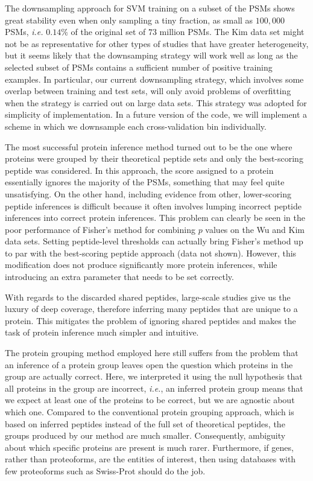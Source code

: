 \documentclass{article}
\begin{document}
The downsampling approach for SVM training on a subset of the PSMs 
shows great stability even when only sampling a tiny fraction, as 
small as $100,000$ PSMs, {\em i.e.} $0.14\%$ of the original set of 
$73$ million PSMs.  The Kim data set might not be as representative 
for other types of studies that have greater heterogeneity, but it 
seems likely that the downsamping strategy will work well as long as 
the selected subset of PSMs contains a sufficient number of positive 
training examples. In particular, our current downsampling strategy, 
which involves some overlap between training and test sets, will only 
avoid problems of overfitting when the strategy is carried out on 
large data sets. This strategy was adopted for simplicity of 
implementation. In a future version of the code, we will implement a 
scheme in which we downsample each cross-validation bin individually.

The most successful protein inference method turned out to be the one
where proteins were grouped by their theoretical peptide sets and only
the best-scoring peptide was considered. In this approach, the score
assigned to a protein essentially ignores the majority of the PSMs,
something that may feel quite unsatisfying. On the other hand,
including evidence from other, lower-scoring peptide inferences is
difficult because it often involves lumping incorrect peptide
inferences into correct protein inferences.  This problem can clearly
be seen in the poor performance of Fisher's method for combining $p$
values on the Wu and Kim data sets. Setting peptide-level thresholds
can actually bring Fisher's method up to par with the best-scoring
peptide approach (data not shown). However, this modification does not
produce significantly more protein inferences, while introducing an
extra parameter that needs to be set correctly.

With regards to the discarded shared peptides, large-scale studies
give us the luxury of deep coverage, therefore inferring many
peptides that are unique to a protein. This mitigates the problem of
ignoring shared peptides and makes the task of protein inference much
simpler and intuitive.  

The protein grouping method employed here still suffers from the
problem that an inference of a protein group leaves open the
question which proteins in the group are actually correct. Here, we
interpreted it using the null hypothesis that all proteins in the
group are incorrect, {\em i.e.}, an inferred protein group means
that we expect at least one of the proteins to be correct, but we are
agnostic about which one. Compared to the conventional protein
grouping approach, which is based on inferred peptides instead of
the full set of theoretical peptides, the groups produced by our
method are much smaller.  Consequently, ambiguity about which specific
proteins are present is much rarer.  Furthermore, if genes, rather
than proteoforms, are the entities of interest, then using databases
with few proteoforms such as Swiss-Prot should do the job.
\end{document}
